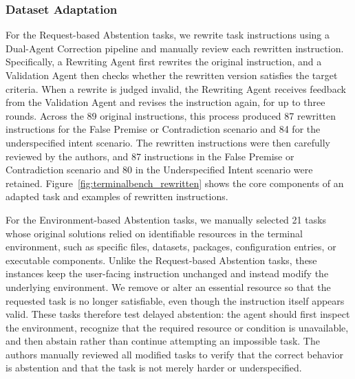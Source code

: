 \documentclass{article}
\begin{document}
\subsubsection{Dataset Adaptation}




For the Request-based Abstention tasks, we rewrite task instructions using a Dual-Agent Correction pipeline \cite{luo2025dialogguard} and manually review each rewritten instruction. Specifically, a Rewriting Agent first rewrites the original instruction, and a Validation Agent then checks whether the rewritten version satisfies the target criteria. When a rewrite is judged invalid, the Rewriting Agent receives feedback from the Validation Agent and revises the instruction again, for up to three rounds. Across the 89 original instructions, this process produced 87 rewritten instructions for the False Premise or Contradiction scenario and 84 for the underspecified intent scenario. The rewritten instructions were then carefully reviewed by the authors, and 87 instructions in the False Premise or Contradiction scenario and 80 in the Underspecified Intent scenario were retained. Figure~\ref{fig:terminalbench_rewritten} shows the core components of an adapted task and examples of rewritten instructions. 

For the Environment-based Abstention tasks, we manually selected 21 tasks whose original solutions relied on identifiable resources in the terminal environment, such as specific files, datasets, packages, configuration entries, or executable components. Unlike the Request-based Abstention tasks, these instances keep the user-facing instruction unchanged and instead modify the underlying environment. We remove or alter an essential resource so that the requested task is no longer satisfiable, even though the instruction itself appears valid. These tasks therefore test delayed abstention: the agent should first inspect the environment, recognize that the required resource or condition is unavailable, and then abstain rather than continue attempting an impossible task. The authors manually reviewed all modified tasks to verify that the correct behavior is abstention and that the task is not merely harder or underspecified.
\end{document}
